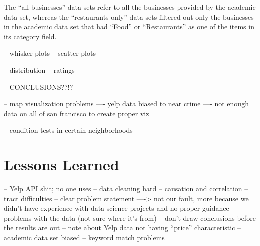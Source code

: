 \documentclass{article}
\begin{document}
The ``all businesses'' data sets refer to all the businesses provided by
the academic data set, whereas the ``restaurants only'' data sets filtered
out only the businesses in the academic data set that had ``Food'' or
``Restaurants'' as one of the items in its category field.

-- whisker plots
-- scatter plots

-- distribution
-- ratings

-- CONCLUSIONS??!?

-- map visualization problems
---- yelp data biased to near crime
---- not enough data on all of san francisco to create proper viz

-- condition tests in certain neighborhoods

\section{Lessons Learned}
\label{sec:lessons-learned}

-- Yelp API shit; no one uses
-- data cleaning hard
-- causation and correlation
-- tract difficulties
-- clear problem statement
----> not our fault, more because we didn't have experience with data
science projects and no proper guidance
-- problems with the data (not sure where it's from)
-- don't draw conclusions before the results are out
-- note about Yelp data not having ``price'' characteristic
-- academic data set biased
-- keyword match problems



\end{document}
